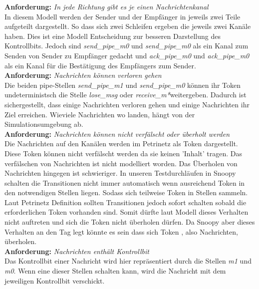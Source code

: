 \documentclass[]{scrartcl}
\begin{document}
\textbf{Anforderung:} \textit{In jede Richtung gibt es je einen Nachrichtenkanal} \\
In diesem Modell werden der Sender und der Empfänger in jeweils zwei Teile aufgeteilt dargestellt. So dass sich zwei Schleifen ergeben die jeweils zwei Kanäle haben. Dies ist eine Modell Entscheidung zur besseren Darstellung des Kontrollbits. Jedoch sind \textit{send\_pipe\_m0} und \textit{send\_pipe\_m0} als ein Kanal zum Senden von Sender zu Empfänger gedacht und \textit{ack\_pipe\_m0} und \textit{ack\_pipe\_m0} als ein Kanal für die Bestätigung des Empfängers zum Sender.\\

\textbf{Anforderung:} \textit{Nachrichten können verloren gehen} \\
Die beiden pipe-Stellen \textit{send\_pipe\_m1} und \textit{send\_pipe\_m0} können ihr Token undeterministsch die Stelle \textit{lose\_msg} oder \textit{receive\_m*}weitergeben. Dadurch ist sichergestellt, dass einige Nachrichten verloren gehen und einige Nachrichten ihr Ziel erreichen. Wieviele Nachrichten wo landen, hängt von der Simulationsumgebung ab.\\

\textbf{Anforderung:} \textit{Nachrichten können nicht verfälscht oder überholt werden} \\
Die Nachrichten auf den Kanälen werden im Petrinetz als Token dargestellt. Diese Token können nicht verfälscht werden da sie keinen 'Inhalt' tragen. Das verfälschen von Nachrichten ist nicht modelliert worden.
Das Überholen von Nachrichten hingegen ist schwieriger. In unseren Testdurchläufen in Snoopy schalten die Transitionen nicht immer automatisch wenn ausreichend Token in den notwendigen Stellen liegen. Sodass sich teilweise Token in Stellen sammeln. Laut Petrinetz Definition sollten Transitionen jedoch sofort schalten sobald die erforderlichen Token vorhanden sind. Somit dürfte laut Modell dieses Verhalten nicht auftreten und sich die Token nicht überholen dürfen. Da Snoopy aber dieses Verhalten an den Tag legt könnte es sein dass sich Token , also Nachrichten, überholen.\\

\textbf{Anforderung:} \textit{Nachrichten enthält Kontrollbit} \\
Das Kontrollbit einer Nachricht wird hier repräsentiert durch die Stellen \textit{m1} und \textit{m0}. Wenn eine dieser Stellen schalten kann, wird die Nachricht mit dem jeweiligen Kontrollbit verschickt.\\
\end{document}
